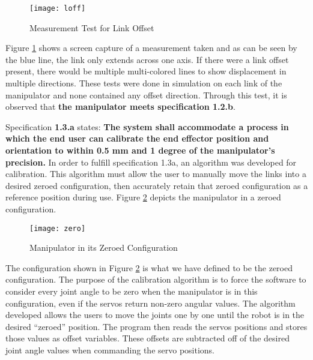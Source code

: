 \begin{figure}[htp]
  \centering
  \texttt{[image: loff]}
  \caption{Measurement Test for Link Offset}
  \label{fig:loff}
\end{figure}

Figure \ref{fig:loff} shows a screen capture of a measurement taken and as can be seen by the blue line, the link only extends across one axis. If there were a link offset present, there would be multiple multi-colored lines to show displacement in multiple directions. These tests were done in simulation on each link of the manipulator and none contained any offset direction. Through this test, it is observed that \textbf{the manipulator meets specification 1.2.b}.

Specification \textbf{1.3.a} states: \textbf{The system shall accommodate a process in which the end user can calibrate the end effector position and orientation to within 0.5 mm and 1 degree of the manipulator’s precision.} In order to fulfill specification 1.3a, an algorithm was developed for calibration. This algorithm must allow the user to manually move the links into a desired zeroed configuration, then accurately retain that zeroed configuration as a reference position during use. Figure \ref{fig:zero} depicts the manipulator in a zeroed configuration.

\begin{figure}[htp]
  \centering
  \texttt{[image: zero]}
  \caption{Manipulator in its Zeroed Configuration}
  \label{fig:zero}
\end{figure}

The configuration shown in Figure \ref{fig:zero} is what we have defined to be the zeroed configuration. The purpose of the calibration algorithm is to force the software to consider every joint angle to be zero when the manipulator is in this configuration, even if the servos return non-zero angular values. The algorithm developed allows the users to move the joints one by one until the robot is in the desired “zeroed” position. The program then reads the servos positions and stores those values as offset variables. These offsets are subtracted off of the desired joint angle values when commanding the servo positions.

